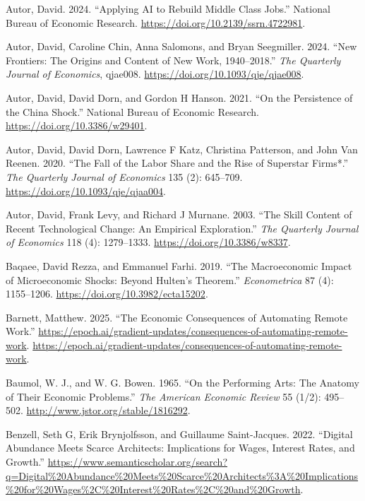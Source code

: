 \documentclass[
  11pt,
  letterpaper,
  DIV=11,
  numbers=noendperiod,
  oneside]{scrartcl}
\newlength{\cslhangindent}
\newenvironment{CSLReferences}[2] %
 {\begin{list}{}{%
  \setlength{\itemindent}{0pt}
  \setlength{\leftmargin}{0pt}
  \setlength{\parsep}{0pt}
  \ifodd #1
   \setlength{\leftmargin}{\cslhangindent}
   \setlength{\itemindent}{-1\cslhangindent}
  \fi
  \setlength{\itemsep}{#2\baselineskip}}}
 {\end{list}}
\begin{document}
\begin{CSLReferences}{1}{0}
Autor, David. 2024. {``Applying AI to Rebuild Middle Class Jobs.''}
National Bureau of Economic Research.
\url{https://doi.org/10.2139/ssrn.4722981}.

Autor, David, Caroline Chin, Anna Salomons, and Bryan Seegmiller. 2024.
{``New Frontiers: The Origins and Content of New Work, 1940--2018.''}
\emph{The Quarterly Journal of Economics}, qjae008.
\url{https://doi.org/10.1093/qje/qjae008}.

Autor, David, David Dorn, and Gordon H Hanson. 2021. {``On the
Persistence of the China Shock.''} National Bureau of Economic Research.
\url{https://doi.org/10.3386/w29401}.

Autor, David, David Dorn, Lawrence F Katz, Christina Patterson, and John
Van Reenen. 2020. {``{The Fall of the Labor Share and the Rise of
Superstar Firms*}.''} \emph{The Quarterly Journal of Economics} 135 (2):
645--709. \url{https://doi.org/10.1093/qje/qjaa004}.

Autor, David, Frank Levy, and Richard J Murnane. 2003. {``The Skill
Content of Recent Technological Change: An Empirical Exploration.''}
\emph{The Quarterly Journal of Economics} 118 (4): 1279--1333.
\url{https://doi.org/10.3386/w8337}.

Baqaee, David Rezza, and Emmanuel Farhi. 2019. {``The Macroeconomic
Impact of Microeconomic Shocks: Beyond Hulten's Theorem.''}
\emph{Econometrica} 87 (4): 1155--1206.
\url{https://doi.org/10.3982/ecta15202}.

Barnett, Matthew. 2025. {``The Economic Consequences of Automating
Remote Work.''}
\url{https://epoch.ai/gradient-updates/consequences-of-automating-remote-work}.
\url{https://epoch.ai/gradient-updates/consequences-of-automating-remote-work}.

Baumol, W. J., and W. G. Bowen. 1965. {``On the Performing Arts: The
Anatomy of Their Economic Problems.''} \emph{The American Economic
Review} 55 (1/2): 495--502. \url{http://www.jstor.org/stable/1816292}.

Benzell, Seth G, Erik Brynjolfsson, and Guillaume Saint-Jacques. 2022.
{``Digital Abundance Meets Scarce Architects: Implications for Wages,
Interest Rates, and Growth.''}
\url{https://www.semanticscholar.org/search?q=Digital\%20Abundance\%20Meets\%20Scarce\%20Architects\%3A\%20Implications\%20for\%20Wages\%2C\%20Interest\%20Rates\%2C\%20and\%20Growth}.


\end{CSLReferences}
\end{document}

